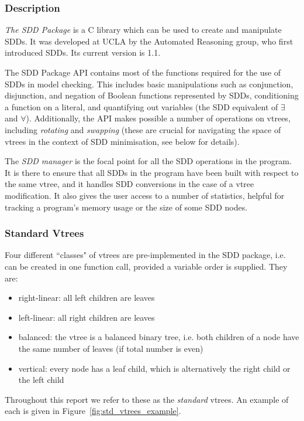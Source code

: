 \documentclass[11pt]{article}
\begin{document}
\subsubsection{Description}

\textit{The SDD Package} is a C library which can be used to create and manipulate SDDs. It was developed at UCLA by the Automated Reasoning group, who first introduced SDDs. Its current version is 1.1.  


The SDD Package API contains most of the functions required for the use of SDDs in model checking. This includes basic manipulations such as conjunction, disjunction, and negation of Boolean functions represented by SDDs, conditioning a function on a literal, and quantifying out variables (the SDD equivalent of $\exists$ and $\forall$). Additionally, the API makes possible a number of operations on vtrees, including \textit{rotating }and \textit{swapping} (these are crucial for navigating the space of vtrees in the context of SDD minimisation, see below for details). 

The \textit{SDD manager} is the focal point for all the SDD operations in the program. It is there to ensure that all SDDs in the program have been built with respect to the same vtree, and it handles SDD conversions in the case of a vtree modification. It also gives the user access to a number of statistics, helpful for tracking a program's memory usage or the size of some SDD nodes. 

\subsubsection{Standard Vtrees}
\label{std_vtrees}

Four different ``classes" of vtrees are pre-implemented in the SDD package, i.e. can be created in one function call, provided a variable order is supplied. 
They are:
\begin{itemize}
\item right-linear: all left children are leaves
\item left-linear: all right children are leaves
\item balanced: the vtree is a balanced binary tree, i.e. both children of a node have the same number of leaves (if total number is even)
\item vertical: every node has a leaf child, which is alternatively the right child or the left child
\end{itemize}
Throughout this report we refer to these as the \textit{standard} vtrees. An example of each is given in Figure~\ref{fig:std_vtrees_example}.
\end{document}
